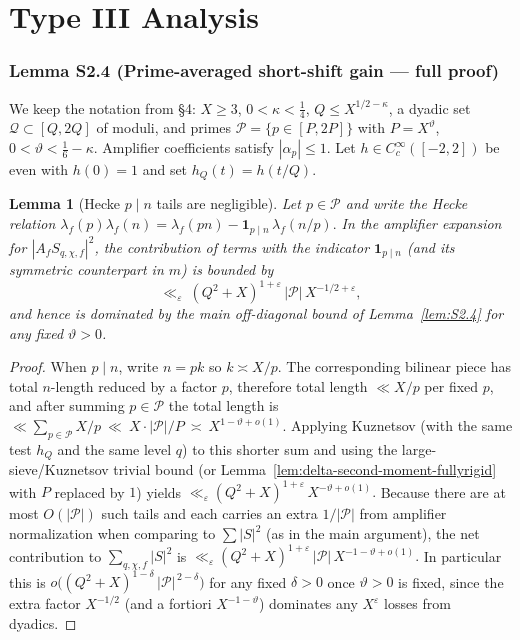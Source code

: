 \documentclass[11pt]{article}
\newtheorem{lemma}{Lemma}[part]
\theoremstyle{definition}
\theoremstyle{remark}
\numberwithin{equation}{part}
\begin{document}
\part{Type III Analysis}

\section{Lemma S2.4 (Prime-averaged short-shift gain — full proof)}

We keep the notation from §4: $X\ge 3$, $0<\kappa<\tfrac14$, $Q\le X^{1/2-\kappa}$, a dyadic set $\mathcal Q\subset[Q,2Q]$ of moduli, and primes $\mathcal P=\{p\in[P,2P]\}$ with $P=X^\vartheta$, $0<\vartheta<\tfrac16-\kappa$. Amplifier coefficients satisfy $|\alpha_p|\le 1$. Let $h\in C_c^\infty([-2,2])$ be even with $h(0)=1$ and set $h_Q(t)=h(t/Q)$.

\begin{lemma}[Hecke $p\mid n$ tails are negligible]\label{lem:hecke-tails}
	Let $p\in\mathcal P$ and write the Hecke relation
	\(
	\lambda_f(p)\lambda_f(n)=\lambda_f(pn)-\mathbf 1_{p\mid n}\,\lambda_f(n/p).
	\)
	In the amplifier expansion for $|A_f S_{q,\chi,f}|^2$,
	the contribution of terms with the indicator $\mathbf 1_{p\mid n}$ (and its symmetric counterpart in $m$)
	is bounded by
	\[
		\ll_\varepsilon\ (Q^2+X)^{1+\varepsilon}\,|\mathcal P|\,X^{-1/2+\varepsilon},
	\]
	and hence is dominated by the main off-diagonal bound of Lemma~\ref{lem:S2.4} for any fixed $\vartheta>0$.
\end{lemma}

\begin{proof}
	When $p\mid n$, write $n=pk$ so $k\asymp X/p$. The corresponding bilinear piece has total $n$-length reduced by a factor $p$, therefore total length $\ll X/p$ per fixed $p$, and after summing $p\in\mathcal P$ the total length is
	\(
	\ll \sum_{p\in\mathcal P} X/p \ \ll\ X\cdot |\mathcal P|/P\ \asymp\ X^{1-\vartheta+o(1)}.
	\)
	Applying Kuznetsov (with the same test $h_Q$ and the same level $q$) to this shorter sum and using the large-sieve/Kuznetsov trivial bound (or Lemma~\ref{lem:delta-second-moment-fullyrigid} with $P$ replaced by $1$) yields
	\(
	\ll_\varepsilon (Q^2+X)^{1+\varepsilon}\,X^{-\vartheta+o(1)}.
	\)
	Because there are at most $O(|\mathcal P|)$ such tails and each carries an extra $1/|\mathcal P|$ from amplifier normalization when comparing to $\sum|S|^2$ (as in the main argument), the net contribution to $\sum_{q,\chi,f}|S|^2$ is
	\(
	\ll_\varepsilon (Q^2+X)^{1+\varepsilon}\,|\mathcal P|\,X^{-1-\vartheta+o(1)}.
	\)
	In particular this is $o\!\big((Q^2+X)^{1-\delta}\,|\mathcal P|^{\,2-\delta}\big)$ for any fixed $\delta>0$ once $\vartheta>0$ is fixed, since the extra factor $X^{-1/2}$ (and a fortiori $X^{-1-\vartheta}$) dominates any $X^{\varepsilon}$ losses from dyadics.
\end{proof}
\end{document}
